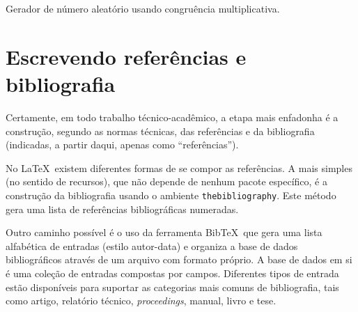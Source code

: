 \documentclass[a4paper,12pt,oneside,onecolumn]{article}
\newcommand{\BibTeX}{{{Bib}}\TeX}
\begin{document}
\alglinenumberson
\begin{algorithm}[!ht]
    \caption{Gerador de número aleatório usando congruência multiplicativa.}
    \label{alg:aleatorio}
    \begin{pseudocode}
      \LinhaEmBranco
      \Documentacao
        \FimFuncao
      \FimDocumentacao
    \end{pseudocode}
\end{algorithm}

\section{Escrevendo referências e bibliografia}\label{cap:referencias}

Certamente, em todo trabalho técnico-acadêmico, a etapa mais enfadonha é a construção, segundo as normas técnicas, das referências e da bibliografia (indicadas, a partir daqui, apenas como ``referências'').

No \LaTeX\ existem diferentes formas de se compor as referências. A mais simples (no sentido de recursos), que não depende de nenhum pacote específico, é a construção da bibliografia usando o ambiente \texttt{thebiblio\-graphy}. Este método gera uma lista de referências bibliográficas numeradas.

Outro caminho possível é o uso da ferramenta \BibTeX\ que gera uma lista alfabética de entradas (estilo autor-data) e organiza a base de dados bibliográficos através de um arquivo com formato próprio. A base de dados em si é uma coleção de entradas compostas por campos. Diferentes tipos de entrada estão disponíveis para suportar as categorias mais comuns de bibliografia, tais como artigo, relatório técnico, \textsl{proceedings}, manual, livro e tese. 
\end{document}
